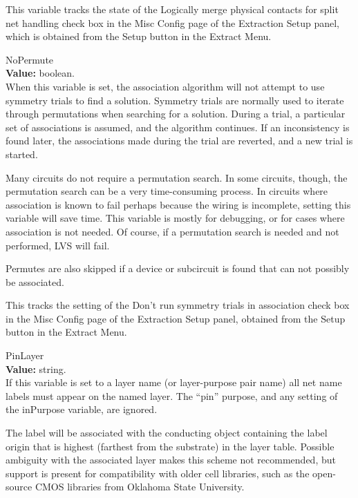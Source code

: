 \begin{description}
This variable tracks the state of the {\cb Logically merge physical
contacts for split net handling} check box in the {\cb Misc Config}
page of the {\cb Extraction Setup} panel, which is obtained from the
{\cb Setup} button in the {\cb Extract Menu}.

\item{\et NoPermute}\\
{\bf Value:} boolean.\\
When this variable is set, the association algorithm will not attempt
to use symmetry trials to find a solution.  Symmetry trials are
normally used to iterate through permutations when searching for a
solution.  During a trial, a particular set of associations is
assumed, and the algorithm continues.  If an inconsistency is found
later, the associations made during the trial are reverted, and a new
trial is started.

Many circuits do not require a permutation search.  In some circuits,
though, the permutation search can be a very time-consuming process. 
In circuits where association is known to fail perhaps because the
wiring is incomplete, setting this variable will save time.  This
variable is mostly for debugging, or for cases where association is
not needed.  Of course, if a permutation search is needed and not
performed, LVS will fail.

Permutes are also skipped if a device or subcircuit is found that can
not possibly be associated.

This tracks the setting of the {\cb Don't run symmetry trials in
association} check box in the {\cb Misc Config} page of the {\cb
Extraction Setup} panel, obtained from the {\cb Setup} button in the
{\cb Extract Menu}.

\item{\et PinLayer}\\
{\bf Value:} string.\\
If this variable is set to a layer name (or layer-purpose pair name)
all net name labels must appear on the named layer.  The ``{\vt pin}''
purpose, and any setting of the {\et inPurpose} variable, are ignored.

The label will be associated with the conducting object containing the
label origin that is highest (farthest from the substrate) in the
layer table.  Possible ambiguity with the associated layer makes this
scheme not recommended, but support is present for compatibility with
older cell libraries, such as the open-source CMOS libraries from
Oklahoma State University.


\end{description}
